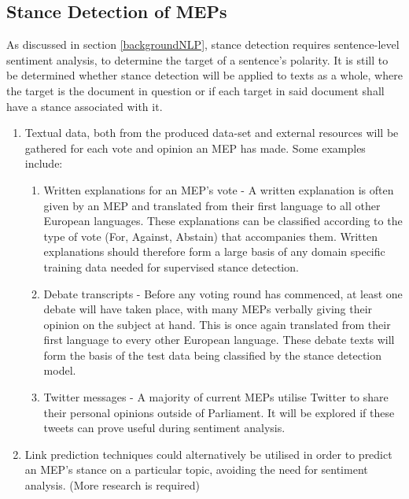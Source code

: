 \documentclass{article}
\begin{document}
\subsection{Stance Detection of MEPs} \label{methodStance}
As discussed in section \ref{backgroundNLP}, stance detection requires sentence-level sentiment analysis, to determine the target of a sentence's polarity. It is still to be 
determined whether stance detection will be applied to texts as a whole, where the target is the document in question or if each target in said document shall have a stance 
associated with it.

\begin{enumerate}
    \item Textual data, both from the produced data-set and external resources will be gathered for each vote and opinion an MEP has made. Some examples include:
    \begin{enumerate}
        \item Written explanations for an MEP's vote \cite{exampleExplanations} - A written explanation is often given by an MEP and translated from their first language to all other 
European languages. These explanations can be classified according to the type of vote (For, Against, Abstain) that accompanies them. Written explanations should therefore form a 
large basis of any domain specific training data needed for supervised stance detection.
        \item Debate transcripts \cite{exampleDebate} - Before any voting round has commenced, at least one debate will have taken place, with many MEPs verbally giving their opinion 
on the subject at hand. This is once again translated from their first language to every other European language. These debate texts will form the basis of the test data being 
classified by the stance detection model.
        \item Twitter messages - A majority of current MEPs utilise Twitter to share their personal opinions outside of Parliament. It will be explored if these tweets can prove 
useful during sentiment analysis.
    \end{enumerate}
    \item Link prediction techniques could alternatively be utilised in order to predict an MEP's stance on a particular topic, avoiding the need for sentiment analysis. (More 
research is required)
\end{enumerate}
\end{document}
